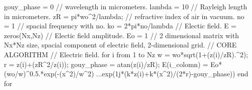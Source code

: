 \documentclass[a4paper]{article}
\begin{document}
{		gouy\_phase = 0 \newline		
		\textcolor{OliveGreen}{// wavelength in micrometers.}\newline
		lambda = 10\newline
		\textcolor{OliveGreen}{// Rayleigh length in micrometers.}\newline
		zR = pi*wo\string^2/lambda;\newline
		\textcolor{OliveGreen}{// refractive index of air in vacuum.}\newline
		no = 1\newline
		\textcolor{OliveGreen}{// spacial frequency with no.}\newline
		ko = 2*pi*no/lambda\newline
		\textcolor{OliveGreen}{// Electic field.}\newline
		E = zeros(Nx,Nz)\newline
		\textcolor{OliveGreen}{// Electic field amplitude.}\newline
		Eo = 1\newline
		\textcolor{OliveGreen}{// 2 dimensional matrix with Nx*Nz size, spacial component of electric field, 2-dimensional grid.}\newpage
		\noindent\textcolor{OliveGreen}{// CORE ALGORITHM}\newline\newline
		\textcolor{OliveGreen}{// Electric field.}\newline
		for i from 1 to Nz \newline
		\indent w = wo*sqrt(1+(z(i)/zR).\string^2);\newline
		\indent r = z(i)+(zR\string^2/z(i));\newline
		\indent gouy\_phase = atan(z(i)/zR);\newline
		\indent E(i\_colomn) = Eo*(wo/w)\string^0.5.*exp(-(x\string^2)/w\string^2) ...\newline \indent\indent\indent\indent\indent\indent\indent\indent*exp(1j*(k*z(i)+k*(x\string^2)/(2*r)-gouy\_phase))\newline
		end for\newline\newline	
	}
	
 
		
\end{document}
